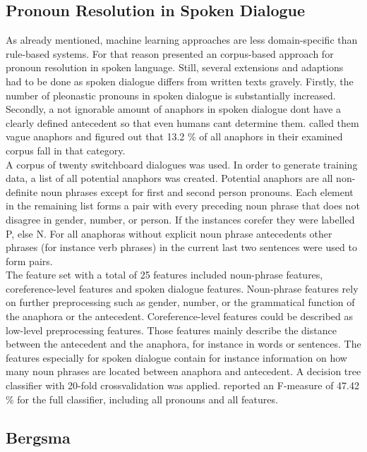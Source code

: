 \subsection{Pronoun Resolution in Spoken Dialogue}
As already mentioned, machine learning approaches are less domain-specific than rule-based systems. For that reason \citep{strube2003machine} presented an corpus-based approach for pronoun resolution in spoken language. Still, several extensions and adaptions had to be done as spoken dialogue differs from written texts gravely. Firstly, the number of pleonastic pronouns in spoken dialogue is substantially increased. Secondly, a not ignorable amount of anaphors in spoken dialogue dont have a clearly defined antecedent so that even humans cant determine them. \citep{eckert2000dialogue} called them vague anaphors and figured out that 13.2 \% of all anaphors in their examined corpus fall in that category.\\
A corpus of twenty switchboard dialogues was used. In order to generate training data, a list of all potential anaphors was created. Potential anaphors are all non-definite noun phrases except for first and second person pronouns. Each element in the remaining list forms a pair with every preceding noun phrase that does not disagree in gender, number, or person. If the instances corefer they were labelled P, else N. For all anaphoras without explicit noun phrase antecedents other phrases (for instance verb phrases) in the current last two sentences were used to form pairs. \\
The feature set with a total of 25 features included noun-phrase features, coreference-level features and spoken dialogue features. Noun-phrase features rely on further preprocessing such as gender, number, or the grammatical function of the anaphora or the antecedent. Coreference-level features could be described as low-level preprocessing features. Those features mainly describe the distance between the antecedent and the anaphora, for instance in words or sentences. The features especially for spoken dialogue contain for instance information on how many noun phrases are located between anaphora and antecedent.
A decision tree classifier with 20-fold crossvalidation was applied. \citep{strube2003machine} reported an F-measure of 47.42 \% for the full classifier, including all pronouns and all features. 


\subsection{Bergsma}


